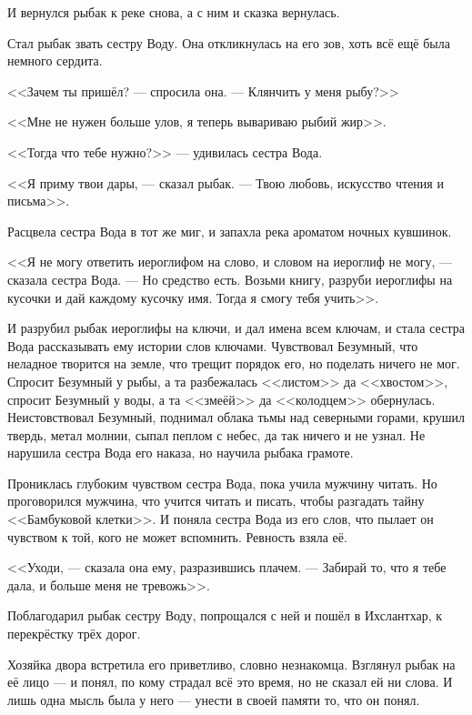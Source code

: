 И вернулся рыбак к реке снова, а с ним и сказка вернулась.

Стал рыбак звать сестру Воду.
Она откликнулась на его зов, хоть всё ещё была немного сердита.

<<Зачем ты пришёл? --- спросила она.
--- Клянчить у меня рыбу?>>

<<Мне не нужен больше улов, я теперь вывариваю рыбий жир>>.

<<Тогда что тебе нужно?>> --- удивилась сестра Вода.

<<Я приму твои дары, --- сказал рыбак.
--- Твою любовь, искусство чтения и письма>>.

Расцвела сестра Вода в тот же миг, и запахла река ароматом ночных кувшинок.

<<Я не могу ответить иероглифом на слово, и словом на иероглиф не могу, --- сказала сестра Вода.
--- Но средство есть.
Возьми книгу, разруби иероглифы на кусочки и дай каждому кусочку имя.
Тогда я смогу тебя учить>>.

И разрубил рыбак иероглифы на ключи, и дал имена всем ключам, и стала сестра Вода рассказывать ему истории слов ключами.
Чувствовал Безумный, что неладное творится на земле, что трещит порядок его, но поделать ничего не мог.
Спросит Безумный у рыбы, а та разбежалась <<листом>> да <<хвостом>>, спросит Безумный у воды, а та <<змеёй>> да <<колодцем>> обернулась.
Неистовствовал Безумный, поднимал облака тьмы над северными горами, крушил твердь, метал молнии, сыпал пеплом с небес\FM, да так ничего и не узнал.
Не нарушила сестра Вода его наказа, но научила рыбака грамоте.

Прониклась глубоким чувством сестра Вода, пока учила мужчину читать.
Но проговорился мужчина, что учится читать и писать, чтобы разгадать тайну <<Бамбуковой клетки>>.
И поняла сестра Вода из его слов, что пылает он чувством к той, кого не может вспомнить.
Ревность взяла её.

<<Уходи, --- сказала она ему, разразившись плачем.
--- Забирай то, что я тебе дала, и больше меня не тревожь>>.

Поблагодарил рыбак сестру Воду, попрощался с ней и пошёл в Ихслантхар, к перекрёстку трёх дорог.

Хозяйка двора встретила его приветливо, словно незнакомца.
Взглянул рыбак на её лицо --- и понял, по кому страдал всё это время, но не сказал ей ни слова.
И лишь одна мысль была у него --- унести в своей памяти то, что он понял.

